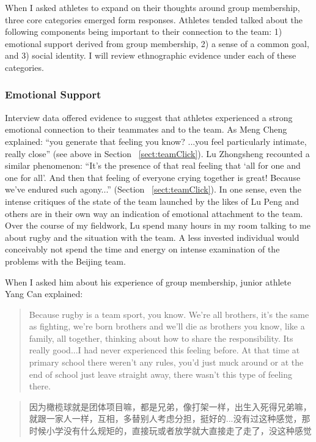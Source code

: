 \begin{CJK}{UTF8}{gbsn}
When I asked athletes to expand on their thoughts around group membership, three core categories emerged form responses.  Athletes tended talked about the following components being important to their connection to the team: 1) emotional support derived from group membership, 2) a sense of a common goal, and 3) social identity. I will review ethnographic evidence under each of these categories.


  \subsubsection{Emotional Support}

Interview data offered evidence to suggest that athletes experienced a strong emotional connection to their teammates and to the team.  As Meng Cheng explained: ``you generate that feeling you know? ...you feel particularly intimate, really close'' (see above in Section ~\ref{sect:teamClick}).  Lu Zhongsheng recounted a similar phenomenon: ``It's the presence of that real feeling that `all for one and one for all'.  And then that feeling of everyone crying together is great! Because we've endured such agony...'' (Section ~\ref{sect:teamClick}). In one sense, even the intense critiques of the state of the team launched by the likes of Lu Peng and others are in their own way an indication of emotional attachment to the team. Over the course of my fieldwork, Lu spend many hours in my room talking to me about rugby and the situation with the team.  A less invested individual would conceivably not spend the time and energy on intense examination of the problems with the Beijing team.

When I asked him about his experience of group membership, junior athlete Yang Can explained:

    \begin{quote}
      Because rugby is a team sport, you know. We’re all brothers, it's the same as fighting, we’re born brothers and we’ll die as brothers you know, like a family, all together, thinking about how to share the responsibility. Its really good...I had never experienced this feeling before.  At that time at primary school there weren’t any rules, you’d just muck around or at the end of school just leave straight away, there wasn’t this type of feeling there.
    \end{quote}

    \begin{quote}
      因为橄榄球就是团体项目嘛，都是兄弟，像打架一样，出生入死得兄弟嘛，就跟一家人一样，互相，多替别人考虑分担，挺好的...没有过这种感觉，那时候小学没有什么规矩的，直接玩或者放学就大直接走了走了，没这种感觉
    \end{quote}


\end{CJK}
